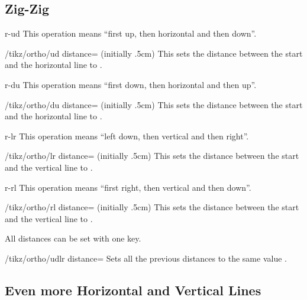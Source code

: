 \subsection{Zig-Zig}
\begin{pathoperation}{r-ud}{}
  This operation means ``first up, then horizontal and then down''.
  \begin{key}{/tikz/ortho/ud distance= (initially .5cm)}
    This sets the distance between the start and the horizontal line to .
  \end{key}
\end{pathoperation}
\begin{pathoperation}{r-du}{}
  This operation means ``first down, then horizontal and then up''.
  \begin{key}{/tikz/ortho/du distance= (initially .5cm)}
    This sets the distance between the start and the horizontal line to .
  \end{key}
\end{pathoperation}
\begin{pathoperation}{r-lr}{}
  This operation means ``left down, then vertical and then right''.
  \begin{key}{/tikz/ortho/lr distance= (initially .5cm)}
    This sets the distance between the start and the vertical line to .
  \end{key}
\end{pathoperation}
\begin{pathoperation}{r-rl}{}
  This operation means ``first right, then vertical and then down''.
  \begin{key}{/tikz/ortho/rl distance= (initially .5cm)}
    This sets the distance between the start and the vertical line to .
  \end{key}
\end{pathoperation}

All distances can be set with one key.
\begin{key}{/tikz/ortho/udlr distance=}
  Sets all the previous distances to the same value .
\end{key}

\subsection{Even more Horizontal and Vertical Lines}

